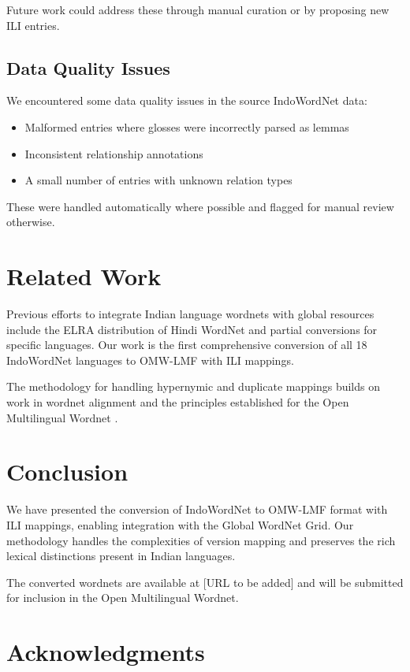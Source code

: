 \documentclass[11pt]{article}
\begin{document}
Future work could address these through manual curation or by proposing new ILI entries.

\subsection{Data Quality Issues}

We encountered some data quality issues in the source IndoWordNet data:
\begin{itemize}
\item Malformed entries where glosses were incorrectly parsed as lemmas
\item Inconsistent relationship annotations
\item A small number of entries with unknown relation types
\end{itemize}

These were handled automatically where possible and flagged for manual review otherwise.

\section{Related Work}

Previous efforts to integrate Indian language wordnets with global resources include the ELRA distribution of Hindi WordNet and partial conversions for specific languages.
Our work is the first comprehensive conversion of all 18 IndoWordNet languages to OMW-LMF with ILI mappings.

The methodology for handling hypernymic and duplicate mappings builds on work in wordnet alignment \cite{daude2003mapping} and the principles established for the Open Multilingual Wordnet \cite{bond2013linking}.

\section{Conclusion}

We have presented the conversion of IndoWordNet to OMW-LMF format with ILI mappings, enabling integration with the Global WordNet Grid.
Our methodology handles the complexities of version mapping and preserves the rich lexical distinctions present in Indian languages.

The converted wordnets are available at [URL to be added] and will be submitted for inclusion in the Open Multilingual Wordnet.

\section*{Acknowledgments}
\end{document}
